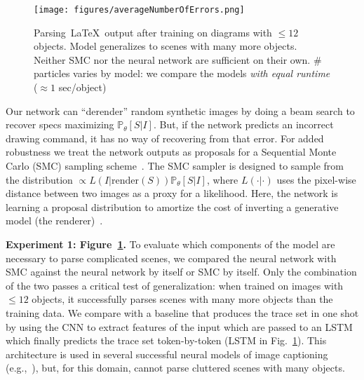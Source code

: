\documentclass{article}
\newcommand{\probability}{\mathds{P}} %
\theoremstyle{definition}
\begin{document}
\begin{figure}
  \vspace{-0.25cm}
  \centering
      \texttt{[image: figures/averageNumberOfErrors.png]}
      \caption{Parsing~\LaTeX~output after training on diagrams with $\leq 12$ objects. Model generalizes to scenes with many more objects. Neither SMC nor the neural network are sufficient on their own. \# particles varies by model: we compare the models \emph{with equal runtime} ($\approx 1$ sec/object)}\label{syntheticResults}\vspace{-0.7cm} 
\end{figure}
Our network can ``derender'' random synthetic images
by doing a beam search to
recover  specs maximizing $\probability_\theta[S|I]$. But, if the network predicts an incorrect
drawing command, it has no way of recovering from that error.  
For added robustness %
we treat the
 network outputs as proposals for a Sequential Monte Carlo (SMC) sampling scheme~\citep{SMCBook}.
The SMC sampler is designed to sample
from the distribution $\propto L(I|\text{render}(S))
\probability_\theta[S|I]$, where $L(\cdot | \cdot)$
uses the pixel-wise distance between two images as a proxy for a
likelihood.
Here, the network is learning a proposal distribution to amortize the cost of inverting a generative model (the renderer)~\citep{paige2016inference}.


\textbf{Experiment 1: Figure~\ref{syntheticResults}.}
  To evaluate which components of the model are necessary to parse complicated scenes,
  we compared  the neural network
  with SMC against the neural network by
itself or SMC by itself.  Only the combination of the two passes a
critical test of generalization: when trained on images with $\leq 12$
objects, it successfully parses scenes with many more objects than the
training data.
We compare with a baseline that produces the trace set in one shot by
using the CNN to extract features of the input which are passed to an LSTM which finally predicts
the trace set token-by-token (LSTM in Fig.~\ref{syntheticResults}).
This architecture is used in several successful neural models of image captioning (e.g.,~\cite{vinyals2015show}),
but, for this domain, cannot parse cluttered scenes with many objects.
\end{document}
